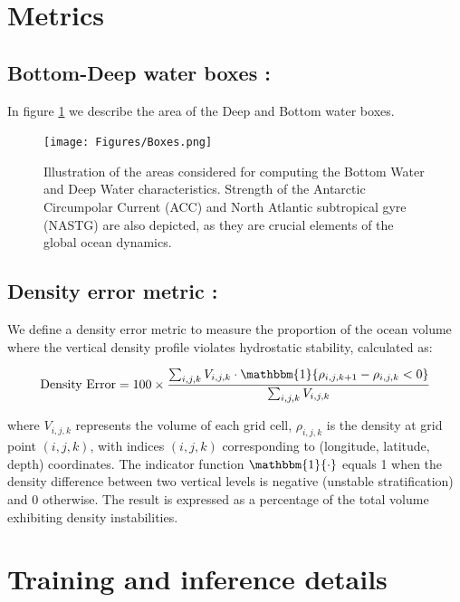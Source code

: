 \section{Metrics}
\label{appendix:metrics}

\subsection{Bottom-Deep water boxes :}

In figure \ref{fig:box} we describe the area of the Deep and Bottom water boxes. 

\begin{figure}[h!]
    \centering
    \texttt{[image: Figures/Boxes.png]}\
    \caption{Illustration of the areas considered for computing the Bottom Water and Deep Water characteristics. Strength of the Antarctic Circumpolar Current (ACC) and North Atlantic subtropical gyre (NASTG) are also depicted, as they are crucial elements of the global ocean dynamics.}
    \label{fig:box}
\end{figure}


\subsection{Density error metric :}

We define a density error metric to measure the proportion of the ocean volume where the vertical density profile violates hydrostatic stability, calculated as:

\begin{equation}
    \text{Density Error} = 100 \times \frac{\sum_{i,j,k} V_{i,j,k} \cdot \mathbbm{1}\{\rho_{i,j,k+1} - \rho_{i,j,k} < 0\}}{\sum_{i,j,k} V_{i,j,k}}
\end{equation}

where $V_{i,j,k}$ represents the volume of each grid cell, $\rho_{i,j,k}$ is the density at grid point $(i,j,k)$, with indices $(i,j,k)$ corresponding to (longitude, latitude, depth) coordinates. The indicator function $\mathbbm{1}\{\cdot\}$ equals 1 when the density difference between two vertical levels is negative (unstable stratification) and 0 otherwise. The result is expressed as a percentage of the total volume exhibiting density instabilities.

\section{Training and inference details}
\label{appendix:training}

